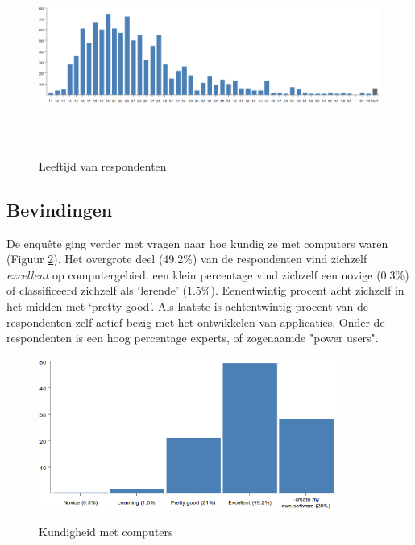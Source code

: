 \documentclass[a4paper, 10pt, pdftex]{report}
\begin{document}
        \begin{figure}
          \begin{center}
          \caption{Leeftijd van respondenten}
            \includegraphics[height=58mm, angle=90]{../images/enquete/age}
          \label{fig:age}

          \end{center}
        \end{figure}

     \newpage
      \subsection{Bevindingen}
        De enqu\^ete ging verder met vragen naar hoe kundig ze met computers waren (Figuur \ref{fig:skill}). Het overgrote deel (49.2\%) van de respondenten vind zichzelf \emph{excellent} op computergebied. een klein percentage vind zichzelf een novige (0.3\%) of classificeerd zichzelf als `lerende' (1.5\%). Eenentwintig procent acht zichzelf in het midden met `pretty good'. Als laatste is achtentwintig procent van de respondenten zelf actief bezig met het ontwikkelen van applicaties. Onder de respondenten is een hoog percentage experts, of zogenaamde "power users".
        \begin{figure}
          \begin{center}
          \caption{Kundigheid met computers}
            \includegraphics[height=50mm]{../images/enquete/good-with-computers}
          \label{fig:skill}
          \end{center}
        \end{figure}
\end{document}
